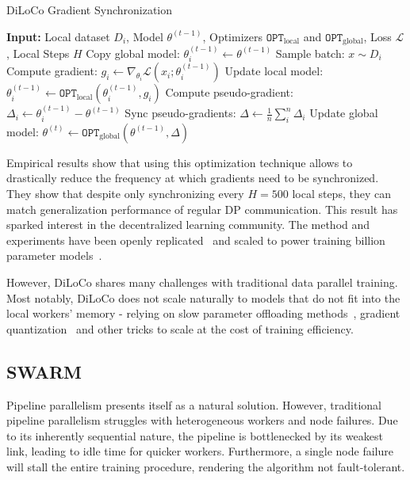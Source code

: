 \documentclass[conference, 10pt]{IEEEtran}
\begin{document}
\begin{algorithm}
\caption{DiLoCo Gradient Synchronization}
\label{alg:diloco}
\begin{algorithmic}[1]
\State \textbf{Input:} Local dataset $D_i$, Model $\theta^{(t-1)}$, Optimizers $\mathtt{OPT}_{\text{local}}$ and $\mathtt{OPT}_{\text{global}}$, Loss $\mathcal{L}$, Local Steps $H$ 
\State Copy global model: $\theta_i^{(t-1)} \gets \theta^{(t-1)}$
  \State Sample batch: $x \sim D_i$
  \State Compute gradient: $g_i \gets \nabla_{\theta_i} \mathcal{L}(x_i; \theta_i^{(t-1)})$
  \State Update local model: $\theta_i^{(t-1)} \gets \mathtt{OPT}_{\text{local}}(\theta_i^{(t-1)}, g_i)$
\EndFor
\State Compute pseudo-gradient: $\Delta_i \gets \theta_i^{(t-1)} - \theta^{(t-1)}$
\State Sync pseudo-gradients: $\Delta \gets \frac{1}{n}\sum_i^n \Delta_i$ 
\State Update global model: $\theta^{(t)} \gets \mathtt{OPT}_{\text{global}}(\theta^{(t-1)}, \Delta)$
\end{algorithmic}
\end{algorithm}

Empirical results show that using this optimization technique allows to
drastically reduce the frequency at which gradients need to be synchronized.
They show that despite only synchronizing every $H=500$ local steps, they can
match generalization performance of regular DP communication. This result has
sparked interest in the decentralized learning community. The method and
experiments have been openly replicated~\cite{jaghouar2024} and scaled to power
training billion parameter models~\cite{intellect1}.

However, DiLoCo shares many challenges with traditional data parallel training.
Most notably, DiLoCo does not scale naturally to models that do not fit into the
local workers' memory - relying on slow parameter offloading
methods~\cite{rhu2016, cui2016}, gradient quantization~\cite{intellect1} and
other tricks to scale at the cost of training efficiency.

\subsection{SWARM}

Pipeline parallelism presents itself as a natural solution. However, traditional
pipeline parallelism struggles with heterogeneous workers and node failures. Due
to its inherently sequential nature, the pipeline is bottlenecked by its weakest
link, leading to idle time for quicker workers. Furthermore, a single node
failure will stall the entire training procedure, rendering the algorithm not
fault-tolerant.
\end{document}
